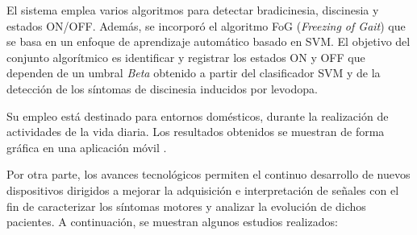 \begin{enumerate}
    El sistema emplea varios algoritmos para detectar bradicinesia, discinesia y estados ON/OFF. Además, se incorporó el algoritmo FoG (\textit{Freezing of Gait}) que se basa en un enfoque de aprendizaje automático basado en SVM. El objetivo del conjunto algorítmico es identificar y registrar los estados ON y OFF que dependen de un umbral \textit{Beta} obtenido a partir del clasificador SVM y de la detección de los síntomas de discinesia inducidos por levodopa.  
    
    Su empleo está destinado para entornos domésticos,  durante la realización de actividades de la vida diaria. Los resultados obtenidos se muestran de forma gráfica en una aplicación móvil
    \cite{rodriguez2022new}.

\end{enumerate}

Por otra parte, los avances tecnológicos permiten el continuo desarrollo de nuevos dispositivos dirigidos a mejorar la adquisición e interpretación de señales con el fin de caracterizar los síntomas motores y analizar la evolución de dichos pacientes. A continuación, se muestran algunos estudios realizados:

